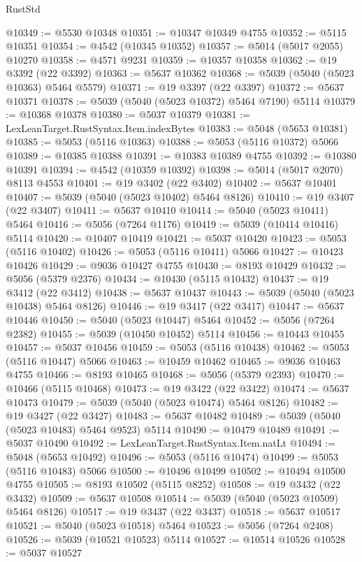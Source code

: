 \begin{lexlean}{RustStd}
\begin{coremodule}
@10349 := @5530 @10348
@10351 := @10347 @10349 @4755
@10352 := @5115 @10351
@10354 := @4542 (@10345 @10352)
@10357 := @5014 (@5017 @2055) @10270
@10358 := @4571 @9231
@10359 := @10357 @10358
@10362 := @19 @3392 (@22 @3392)
@10363 := @5637 @10362
@10368 := @5039 (@5040 (@5023 @10363) @5464 @5579)
@10371 := @19 @3397 (@22 @3397)
@10372 := @5637 @10371
@10378 := @5039 (@5040 (@5023 @10372) @5464 @7190) @5114
@10379 := @10368 @10378
@10380 := @5037 @10379
@10381 := LexLeanTarget.RustSyntax.Item.indexBytes
@10383 := @5048 (@5653 @10381)
@10385 := @5053 (@5116 @10363)
@10388 := @5053 (@5116 @10372) @5066
@10389 := @10385 @10388
@10391 := @10383 @10389 @4755
@10392 := @10380 @10391
@10394 := @4542 (@10359 @10392)
@10398 := @5014 (@5017 @2070) @8113 @4553
@10401 := @19 @3402 (@22 @3402)
@10402 := @5637 @10401
@10407 := @5039 (@5040 (@5023 @10402) @5464 @8126)
@10410 := @19 @3407 (@22 @3407)
@10411 := @5637 @10410
@10414 := @5040 (@5023 @10411) @5464
@10416 := @5056 (@7264 @1176)
@10419 := @5039 (@10414 @10416) @5114
@10420 := @10407 @10419
@10421 := @5037 @10420
@10423 := @5053 (@5116 @10402)
@10426 := @5053 (@5116 @10411) @5066
@10427 := @10423 @10426
@10429 := @9036 @10427 @4755
@10430 := @8193 @10429
@10432 := @5056 (@5379 @2376)
@10434 := @10430 (@5115 @10432)
@10437 := @19 @3412 (@22 @3412)
@10438 := @5637 @10437
@10443 := @5039 (@5040 (@5023 @10438) @5464 @8126)
@10446 := @19 @3417 (@22 @3417)
@10447 := @5637 @10446
@10450 := @5040 (@5023 @10447) @5464
@10452 := @5056 (@7264 @2382)
@10455 := @5039 (@10450 @10452) @5114
@10456 := @10443 @10455
@10457 := @5037 @10456
@10459 := @5053 (@5116 @10438)
@10462 := @5053 (@5116 @10447) @5066
@10463 := @10459 @10462
@10465 := @9036 @10463 @4755
@10466 := @8193 @10465
@10468 := @5056 (@5379 @2393)
@10470 := @10466 (@5115 @10468)
@10473 := @19 @3422 (@22 @3422)
@10474 := @5637 @10473
@10479 := @5039 (@5040 (@5023 @10474) @5464 @8126)
@10482 := @19 @3427 (@22 @3427)
@10483 := @5637 @10482
@10489 := @5039 (@5040 (@5023 @10483) @5464 @9523) @5114
@10490 := @10479 @10489
@10491 := @5037 @10490
@10492 := LexLeanTarget.RustSyntax.Item.natLt
@10494 := @5048 (@5653 @10492)
@10496 := @5053 (@5116 @10474)
@10499 := @5053 (@5116 @10483) @5066
@10500 := @10496 @10499
@10502 := @10494 @10500 @4755
@10505 := @8193 @10502 (@5115 @8252)
@10508 := @19 @3432 (@22 @3432)
@10509 := @5637 @10508
@10514 := @5039 (@5040 (@5023 @10509) @5464 @8126)
@10517 := @19 @3437 (@22 @3437)
@10518 := @5637 @10517
@10521 := @5040 (@5023 @10518) @5464
@10523 := @5056 (@7264 @2408)
@10526 := @5039 (@10521 @10523) @5114
@10527 := @10514 @10526
@10528 := @5037 @10527

\end{coremodule}
\end{lexlean}
